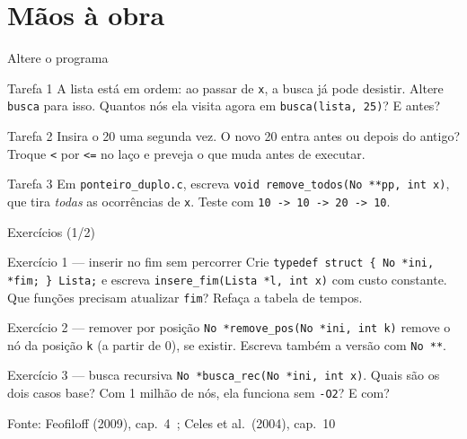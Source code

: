 \documentclass[aspectratio=169]{beamer}
\newcommand{\fonte}[1]{\vfill\hfill{\scriptsize\textcolor{UFSGray}{Fonte: #1}}}
\begin{document}
\section{Mãos à obra}

\begin{frame}{Altere o programa}
  \small
  \begin{block}{Tarefa 1}
    A lista está em ordem: ao passar de \texttt{x}, a busca já pode
    desistir. Altere \texttt{busca} para isso. Quantos nós ela visita agora
    em \texttt{busca(lista, 25)}? E antes?
  \end{block}
  \begin{block}{Tarefa 2}
    Insira o 20 uma segunda vez. O novo 20 entra antes ou depois do antigo?
    Troque \texttt{<} por \texttt{<=} no laço e preveja o que muda antes de
    executar.
  \end{block}
  \begin{block}{Tarefa 3}
    Em \texttt{ponteiro\_duplo.c}, escreva \texttt{void remove\_todos(No
    **pp, int x)}, que tira \emph{todas} as ocorrências de \texttt{x}. Teste
    com \texttt{10 -> 10 -> 20 -> 10}.
  \end{block}
\end{frame}

\begin{frame}{Exercícios (1/2)}
  \footnotesize
  \begin{block}{Exercício 1 --- inserir no fim sem percorrer}
    Crie \texttt{typedef struct \{ No *ini, *fim; \} Lista;} e escreva
    \texttt{insere\_fim(Lista *l, int x)} com custo constante. Que funções
    precisam atualizar \texttt{fim}? Refaça a tabela de tempos.
  \end{block}
  \begin{block}{Exercício 2 --- remover por posição}
    \texttt{No *remove\_pos(No *ini, int k)} remove o nó da posição
    \texttt{k} (a partir de 0), se existir. Escreva também a versão com
    \texttt{No **}.
  \end{block}
  \begin{block}{Exercício 3 --- busca recursiva}
    \texttt{No *busca\_rec(No *ini, int x)}. Quais são os dois casos base?
    Com 1 milhão de nós, ela funciona sem \texttt{-O2}? E com?
  \end{block}
  \fonte{Feofiloff (2009), cap.~4~\cite{feofiloff2009algoritmos};
    Celes et al.\ (2004), cap.~10~\cite{celes2004introducao}}
\end{frame}
\end{document}
